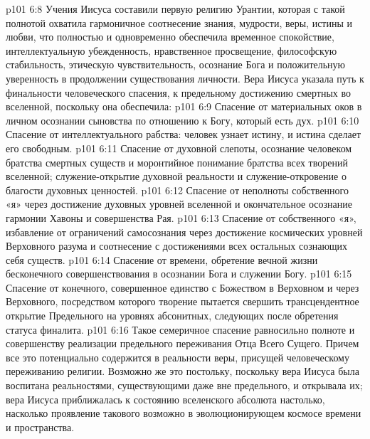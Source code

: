 \vs p101 6:8 Учения Иисуса составили первую религию Урантии, которая с такой полнотой охватила гармоничное соотнесение знания, мудрости, веры, истины и любви, что полностью и одновременно обеспечила временное спокойствие, интеллектуальную убежденность, нравственное просвещение, философскую стабильность, этическую чувствительность, осознание Бога и положительную уверенность в продолжении существования личности. Вера Иисуса указала путь к финальности человеческого спасения, к предельному достижению смертных во вселенной, поскольку она обеспечила:
\vs p101 6:9 \bibnobreakspace Спасение от материальных оков в личном осознании сыновства по отношению к Богу, который есть дух.
\vs p101 6:10 \bibnobreakspace Спасение от интеллектуального рабства: человек узнает истину, и истина сделает его свободным.
\vs p101 6:11 \bibnobreakspace Спасение от духовной слепоты, осознание человеком братства смертных существ и моронтийное понимание братства всех творений вселенной; служение\hyp{}открытие духовной реальности и служение\hyp{}откровение о благости духовных ценностей.
\vs p101 6:12 \bibnobreakspace Спасение от неполноты собственного «я» через достижение духовных уровней вселенной и окончательное осознание гармонии Хавоны и совершенства Рая.
\vs p101 6:13 \bibnobreakspace Спасение от собственного «я», избавление от ограничений самосознания через достижение космических уровней Верховного разума и соотнесение с достижениями всех остальных сознающих себя существ.
\vs p101 6:14 \bibnobreakspace Спасение от времени, обретение вечной жизни бесконечного совершенствования в осознании Бога и служении Богу.
\vs p101 6:15 \bibnobreakspace Спасение от конечного, совершенное единство с Божеством в Верховном и через Верховного, посредством которого творение пытается свершить трансцендентное открытие Предельного на уровнях абсонитных, следующих после обретения статуса финалита.
\vs p101 6:16 \pc Такое семеричное спасение равносильно полноте и совершенству реализации предельного переживания Отца Всего Сущего. Причем все это потенциально содержится в реальности веры, присущей человеческому переживанию религии. Возможно же это постольку, поскольку вера Иисуса была воспитана реальностями, существующими даже вне предельного, и открывала их; вера Иисуса приближалась к состоянию вселенского абсолюта настолько, насколько проявление такового возможно в эволюционирующем космосе времени и пространства.
